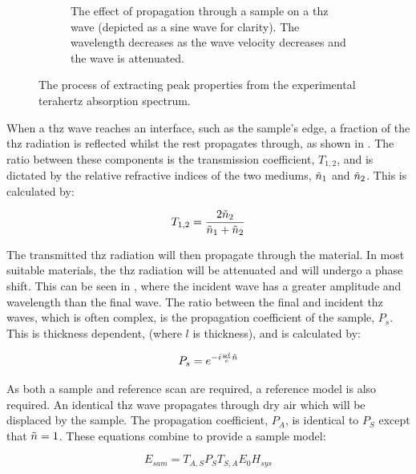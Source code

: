 \begin{figure}
\begin{subfigure}{0.49\textwidth}
    \captionsetup{font = footnotesize, justification = centering}
    \caption{The effect of propagation through a sample on a \acrshort{thz} wave (depicted as a sine wave for clarity). The wavelength decreases as the wave velocity decreases and the wave is attenuated.}
    \label{fig:waveattentuation}
\end{subfigure}
\captionsetup{font = footnotesize, justification = centering}
\caption[Extraction of Experimental Peak Widths]{The process of extracting peak properties from the experimental terahertz absorption spectrum.}
\label{Fig:transfermodel}
\end{figure}

When a \acrshort{thz} wave reaches an interface, such as the sample’s edge, a fraction of the \acrshort{thz} radiation is reflected whilst the rest propagates through, as shown in . The ratio between these components is the transmission coefficient, \(T_{1,2}\), and is dictated by the relative refractive indices of the two mediums, \(\Tilde{n}_1\) and \(\Tilde{n}_2\). This is calculated by:

\begin{equation}
T_{1,2} = \frac{2\Tilde{n}_2}{\Tilde{n}_1 + \Tilde{n}_2}
\end{equation}

The transmitted \acrshort{thz} radiation will then propagate through the material. In most suitable materials, the \acrshort{thz} radiation will be attenuated and will undergo a phase shift. This can be seen in , where the incident wave has a greater amplitude and wavelength than the final wave. The ratio between the final and incident \acrshort{thz} waves, which is often complex, is the propagation coefficient of the sample, \(P_s\). This is thickness dependent, (where \(l\) is thickness), and is calculated by:

\begin{equation}
P_s = e^{-i\frac{\omega l}{c} \Tilde{n}}
\end{equation}

As both a sample and reference scan are required, a reference model is also required. An identical \acrshort{thz} wave propagates through dry air which will be displaced by the sample. The propagation coefficient, \(P_A\), is identical to \(P_S\) except that \(\Tilde{n} = 1\). These equations combine to provide a sample model:

\begin{equation}
E_{sam} = T_{A,S} P_S T_{S,A} E_0 H_{sys}
\end{equation}

